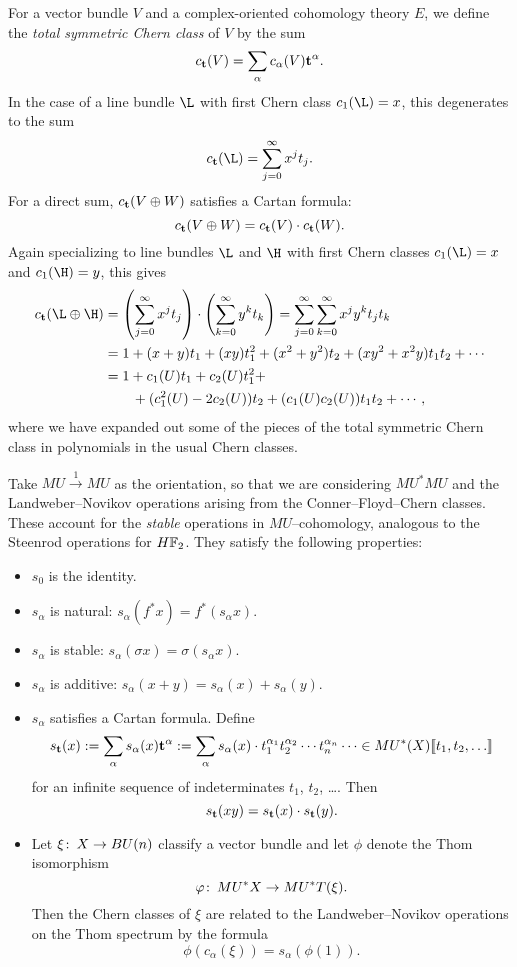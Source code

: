 \begin{remark}
For a vector bundle \(V\) and a complex-oriented cohomology theory \(E\), we define the \textit{total symmetric Chern class} of \(V\) by the sum \[c_{\mathbf t}(V) = \sum_\alpha c_\alpha(V) \mathbf t^{\alpha}.\]  In the case of a line bundle \(\L\) with first Chern class \(c_1(\L) = x\), this degenerates to the sum \[c_{\t}(\L) = \sum_{j=0}^\infty x^j t_j.\]  For a direct sum, \(c_{\mathbf t}(V \oplus W)\) satisfies a Cartan formula: \[c_{\mathbf t}(V \oplus W) = c_{\mathbf t}(V) \cdot c_{\mathbf t}(W).\]  Again specializing to line bundles \(\L\) and \(\H\) with first Chern classes \(c_1(\L) = x\) and \(c_1(\H) = y\), this gives
\begin{align*}
c_{\t}(\L \oplus \H) & = \left( \sum_{j=0}^\infty x^j t_j \right) \cdot \left( \sum_{k=0}^\infty y^k t_k \right) = \sum_{j = 0}^{\infty} \sum_{k=0}^\infty x^j y^k t_j t_k \\
& = 1 + (x + y)t_1 + (xy)t_1^2 + (x^2 + y^2)t_2 + (xy^2 + x^2y)t_1 t_2 + \cdots \\
& = 1 + c_1(U)t_1 + c_2(U)t_1^2 + \\
& \quad \quad + (c_1^2(U) - 2c_2(U))t_2 + (c_1(U) c_2(U))t_1t_2 + \cdots,
\end{align*}
where we have expanded out some of the pieces of the total symmetric Chern class in polynomials in the usual Chern classes.
\end{remark}

\begin{definition}
Take \(MU \xrightarrow{1} MU\) as the orientation, so that we are considering \(MU^* MU\) and the Landweber--Novikov operations arising from the Conner--Floyd--Chern classes.  These account for the \emph{stable} operations in \(MU\)--cohomology, analogous to the Steenrod operations for \(\HFtwo\).  They satisfy the following properties:
\begin{itemize}
\item \(s_0\) is the identity.
\item \(s_\alpha\) is natural: \(s_\alpha(f^* x) = f^*(s_\alpha x)\).
\item \(s_\alpha\) is stable: \(s_\alpha(\sigma x) = \sigma(s_\alpha x)\).
\item \(s_\alpha\) is additive: \(s_\alpha(x + y) = s_\alpha(x) + s_\alpha(y)\).
\item \(s_\alpha\) satisfies a Cartan formula.  Define \[s_{\mathbf t}(x) := \sum_{\alpha} s_\alpha(x) \mathbf t^\alpha := \sum_\alpha s_\alpha(x) \cdot t_1^{\alpha_1} t_2^{\alpha_2} \cdots t_n^{\alpha_n} \cdots \in MU^*(X)\llbracket{t_1, t_2, \ldots}\rrbracket\] for an infinite sequence of indeterminates \(t_1\), \(t_2\), \ldots.  Then \[s_{\mathbf t}(x y) = s_{\mathbf t}(x) \cdot s_{\mathbf t}(y).\]
\item Let \(\xi\colon\thinspace X \to BU(n)\) classify a vector bundle and let \(\phi\) denote the Thom isomorphism \[\varphi\colon\thinspace MU^* X \to MU^* T(\xi).\]  Then the Chern classes of \(\xi\) are related to the Landweber--Novikov operations on the Thom spectrum by the formula \[\phi(c_\alpha(\xi)) = s_\alpha(\phi(1)).\]
\end{itemize}
\end{definition}

